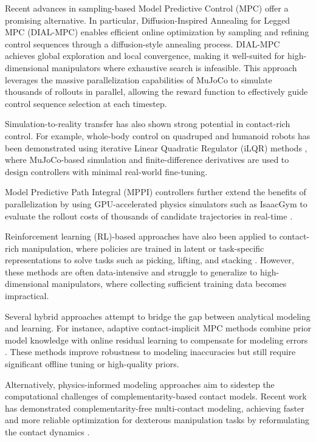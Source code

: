 \documentclass[conference]{IEEEtran}
\begin{document}
Recent advances in sampling-based Model Predictive Control (MPC) offer a promising alternative. In particular, Diffusion-Inspired Annealing for Legged MPC (DIAL-MPC) \cite{xue2024fullordersamplingbasedmpctorquelevel} enables efficient online optimization by sampling and refining control sequences through a diffusion-style annealing process. DIAL-MPC achieves global exploration and local convergence, making it well-suited for high-dimensional manipulators where exhaustive search is infeasible. This approach leverages the massive parallelization capabilities of MuJoCo to simulate thousands of rollouts in parallel, allowing the reward function to effectively guide control sequence selection at each timestep.

Simulation-to-reality transfer has also shown strong potential in contact-rich control. For example, whole-body control on quadruped and humanoid robots has been demonstrated using iterative Linear Quadratic Regulator (iLQR) methods \cite{zhang2025wholebodymodelpredictivecontrollegged}, where MuJoCo-based simulation and finite-difference derivatives are used to design controllers with minimal real-world fine-tuning.

Model Predictive Path Integral (MPPI) controllers further extend the benefits of parallelization by using GPU-accelerated physics simulators such as IsaacGym to evaluate the rollout costs of thousands of candidate trajectories in real-time \cite{pezzato2025samplingbasedmodelpredictivecontrol}.

Reinforcement learning (RL)-based approaches have also been applied to contact-rich manipulation, where policies are trained in latent or task-specific representations to solve tasks such as picking, lifting, and stacking \cite{hansen2024tdmpc2scalablerobustworld}. However, these methods are often data-intensive and struggle to generalize to high-dimensional manipulators, where collecting sufficient training data becomes impractical.

Several hybrid approaches attempt to bridge the gap between analytical modeling and learning. For instance, adaptive contact-implicit MPC methods combine prior model knowledge with online residual learning to compensate for modeling errors \cite{huang2024adaptivecontactimplicitmodelpredictive}. These methods improve robustness to modeling inaccuracies but still require significant offline tuning or high-quality priors.

Alternatively, physics-informed modeling approaches aim to sidestep the computational challenges of complementarity-based contact models. Recent work has demonstrated complementarity-free multi-contact modeling, achieving faster and more reliable optimization for dexterous manipulation tasks by reformulating the contact dynamics \cite{jin2025complementarityfreemulticontactmodelingoptimization}.
\end{document}
